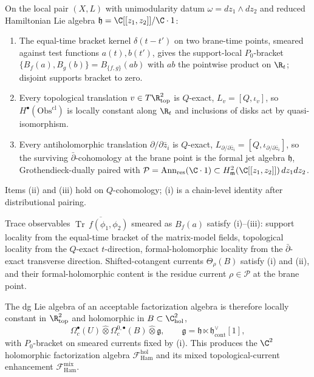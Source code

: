 \begin{thm}
\label{thm:dict-kinematic-locality}
On the local pair \((X,L)\) with unimodularity datum
\(\omega=dz_1\wedge dz_2\) and reduced Hamiltonian Lie algebra
\(\mathfrak h=\C[[z_1,z_2]]/\C\cdot1\):
\begin{enumerate}
\item[(i)] The equal-time bracket kernel \(\delta(t-t')\) on two
  brane-time points, smeared against test functions \(a(t),b(t')\),
  gives the support-local \(P_0\)-bracket
  \(\{B_f(a),B_g(b)\}=B_{\{f,g\}}(ab)\) with \(ab\) the pointwise
  product on \(\R_t\); disjoint supports bracket to zero.
\item[(ii)] Every topological translation
  \(v\in T\R^2_{\mathrm{top}}\) is \(Q\)-exact, \(L_v=[Q,\iota_v]\),
  so \(H^\bullet(\mathrm{Obs}^{\mathrm{cl}})\) is locally constant
  along \(\R_t\) and inclusions of disks act by quasi-isomorphism.
\item[(iii)] Every antiholomorphic translation
  \(\partial/\partial\bar z_i\) is \(Q\)-exact,
  \(L_{\partial/\partial\bar z_i}=[Q,\iota_{\partial/\partial\bar z_i}]\),
  so the surviving \(\bar\partial\)-cohomology at the brane point is
  the formal jet algebra \(\mathfrak h\), Grothendieck-dually paired
  with
  \(\mathcal P=\operatorname{Ann}_{\mathrm{res}}(\C\cdot1)\subset
  H^2_{\mathfrak m}(\C[[z_1,z_2]])\,dz_1dz_2\).
\end{enumerate}
Items (ii) and (iii) hold on \(Q\)-cohomology; (i) is a chain-level
identity after distributional pairing.

Trace observables
\(\overline{\operatorname{Tr}\,f(\phi_1,\phi_2)}\) smeared as
\(B_f(a)\) satisfy (i)--(iii): support locality from the equal-time
bracket of the matrix-model fields, topological locality from the
\(Q\)-exact \(t\)-direction, formal-holomorphic locality from the
\(\bar\partial\)-exact transverse direction.  Shifted-cotangent
currents \(\Theta_\rho(B)\) satisfy (i) and (ii), and their
formal-holomorphic content is the residue current
\(\rho\in\mathcal P\) at the brane point.

The dg Lie algebra of an acceptable factorization algebra is therefore
locally constant in \(\R^2_{\mathrm{top}}\) and holomorphic in
\(B\subset\C^2_{\mathrm{hol}}\),
\[
  \Omega_c^\bullet(U)\widehat\otimes
  \Omega_c^{0,\bullet}(B)\widehat\otimes
  \mathfrak g,\qquad
  \mathfrak g=\mathfrak h\ltimes
  \mathfrak h^\vee_{\mathrm{cont}}[1],
\]
with \(P_0\)-bracket on smeared currents fixed by (i).  This produces
the \(\C^2\) holomorphic factorization algebra
\(\mathcal F_{\mathrm{Ham}}^{\mathrm{hol}}\) and its mixed
topological-current enhancement
\(\mathcal F_{\mathrm{Ham}}^{\mathrm{mix}}\).
\end{thm}

